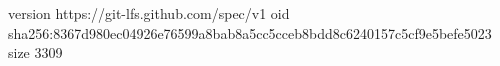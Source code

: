 version https://git-lfs.github.com/spec/v1
oid sha256:8367d980ec04926e76599a8bab8a5cc5cceb8bdd8c6240157c5cf9e5befe5023
size 3309
